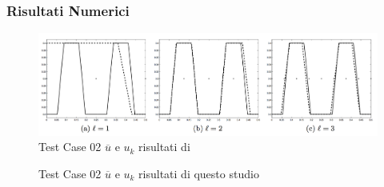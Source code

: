 \subsubsection{Risultati Numerici}
\begin{figure}
\centering
\includegraphics[width=\linewidth]{img/cap6/TestCase02_ues_paper}
\caption{Test Case 02 $\overline{u}$ e $u_k$ risultati di \cite{MAIN}}
\label{fig:502}
\end{figure}

\begin{figure}
\centering%
\qquad
{}\qquad
{}
\caption{Test Case 02 $\overline{u}$ e $u_k$ risultati di questo studio}
\label{fig:503}
\end{figure}